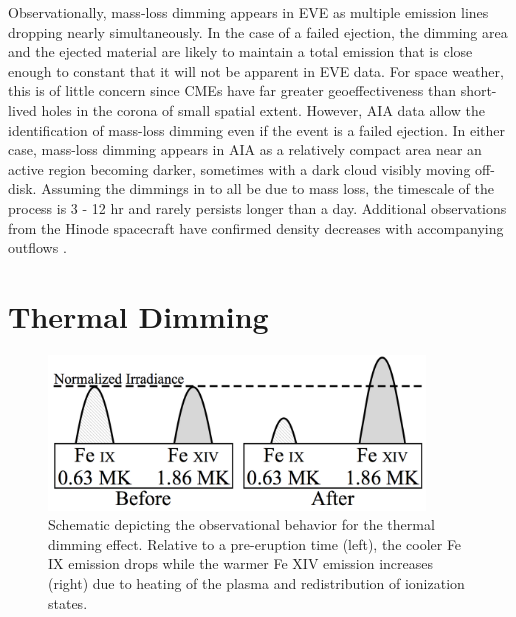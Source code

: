 Observationally, mass-loss dimming appears in EVE as multiple emission lines dropping nearly simultaneously. In the case of a failed ejection, the dimming area and the ejected material are likely to maintain a total emission that is close enough to constant that it will not be apparent in EVE data. For space weather, this is of little concern since CMEs have far greater geoeffectiveness than short-lived holes in the corona of small spatial extent. However, AIA data allow the identification of mass-loss dimming even if the event is a failed ejection. In either case, mass-loss dimming appears in AIA as a relatively compact area near an active region becoming darker, sometimes with a dark cloud visibly moving off-disk. Assuming the dimmings in \citet{Reinard2008} to all be due to mass loss, the timescale of the process is 3 - 12 hr and rarely persists longer than a day. Additional observations from the Hinode spacecraft have confirmed density decreases with accompanying outflows \citep{Attrill2010, Harra2010, Tian2012}.

\section{Thermal Dimming}
\label{sec:thermalDimming}

\begin{figure}[!h]
    \begin{center}
	    \includegraphics[width=100mm]{Images/ThermalDimming.png}
    \end{center}
    \caption[Schematic of thermal dimming]{
	    Schematic depicting the observational behavior for the thermal dimming effect. Relative to a pre-eruption time 
	    (left), the cooler Fe IX emission drops while the warmer Fe XIV emission increases (right) due to heating of the 
	    plasma and redistribution of ionization states.
	}
    \label{thermalDimming}
\end{figure}

